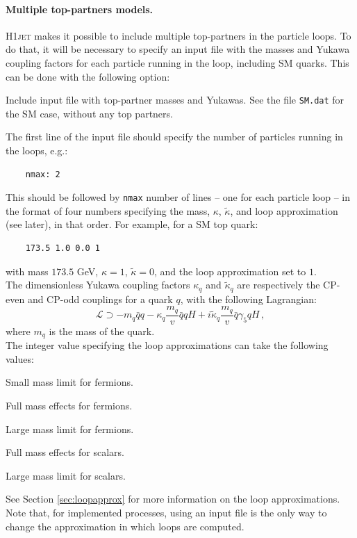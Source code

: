 \documentclass[12pt]{article}
\begin{document}
\paragraph{Multiple top-partners models.}
\textsc{H1jet} makes it possible to include multiple top-partners in
the particle loops. To do that, it will be necessary to specify an input
file with the masses and Yukawa coupling factors for each particle
running in the loop, including SM quarks. This can be done with the
following option:
\begin{description}[labelindent=1cm, labelwidth =\widthof{\bfseries9999999999999999999999}, leftmargin = !] 
\item[\texttt{-i, -{}-in <file>}] Include input file with top-partner
  masses and Yukawas. See the file \texttt{SM.dat} for the SM case,
  without any top partners.
\end{description} 
The first line of the input file should specify the number of
particles running in the loops, e.g.:
\begin{lstlisting}
	nmax: 2 
\end{lstlisting}
This should be followed by \texttt{nmax} number of lines -- one for each particle loop -- in the format of four numbers specifying the mass, $\kappa$, $\tilde{\kappa}$, and loop approximation (see later), in that order. For example, for a SM top quark: 
\begin{lstlisting}
	173.5 1.0 0.0 1 
\end{lstlisting}
with mass $173.5$ GeV, $\kappa = 1$, $\tilde{\kappa} = 0$, and the loop approximation set to $1$. \\ 

The dimensionless Yukawa coupling factors $\kappa_q$ and $\tilde{\kappa}_q$ are respectively the CP-even and CP-odd couplings for a quark $q$, with the following Lagrangian: 
\begin{equation}
	\mathcal{L} \supset -m_q \bar{q}q - \kappa_q \frac{m_q}{v} \bar{q}q H + i \tilde{\kappa}_q \frac{m_q}{v} \bar{q} \gamma_5 q H \,,
\end{equation}
where $m_q$ is the mass of the quark. \\ 

The integer value specifying the loop approximations can take the following values: 
\begin{description}[labelindent=1cm, labelwidth =\widthof{\bfseries9999}, leftmargin = !] 
	\item[$0$] Small mass limit for fermions. 
	\item[$1$] Full mass effects for fermions. 
	\item[$2$] Large mass limit for fermions. 
	\item[$3$] Full mass effects for scalars. 
	\item[$4$] Large mass limit for scalars. 
\end{description}
See Section \ref{sec:loopapprox} for more information on the loop
approximations. Note that, for implemented processes, using an input
file is the only way to change the approximation in which loops are
computed.
\end{document}
